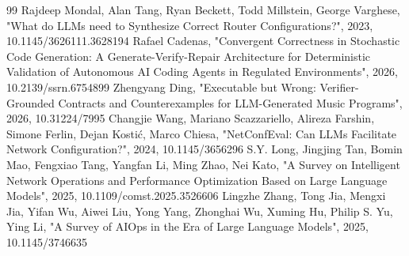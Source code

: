 \documentclass[conference]{IEEEtran}
\begin{document}
\begin{thebibliography}{99}
 Rajdeep Mondal, Alan Tang, Ryan Beckett, Todd Millstein, George Varghese, "What do LLMs need to Synthesize Correct Router Configurations?", 2023, 10.1145/3626111.3628194
 Rafael Cadenas, "Convergent Correctness in Stochastic Code Generation: A Generate-Verify-Repair Architecture for Deterministic Validation of Autonomous AI Coding Agents in Regulated Environments", 2026, 10.2139/ssrn.6754899
 Zhengyang Ding, "Executable but Wrong: Verifier-Grounded Contracts and Counterexamples for LLM-Generated Music Programs", 2026, 10.31224/7995
 Changjie Wang, Mariano Scazzariello, Alireza Farshin, Simone Ferlin, Dejan Kostić, Marco Chiesa, "NetConfEval: Can LLMs Facilitate Network Configuration?", 2024, 10.1145/3656296
 S.Y. Long, Jingjing Tan, Bomin Mao, Fengxiao Tang, Yangfan Li, Ming Zhao, Nei Kato, "A Survey on Intelligent Network Operations and Performance Optimization Based on Large Language Models", 2025, 10.1109/comst.2025.3526606
 Lingzhe Zhang, Tong Jia, Mengxi Jia, Yifan Wu, Aiwei Liu, Yong Yang, Zhonghai Wu, Xuming Hu, Philip S. Yu, Ying Li, "A Survey of AIOps in the Era of Large Language Models", 2025, 10.1145/3746635
\end{thebibliography}
\end{document}
